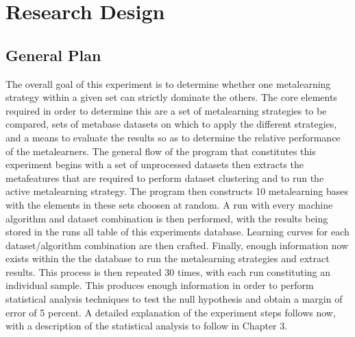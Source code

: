 \chapter{Research Design}
\label{Chapter3}
\section{General Plan}
The overall goal of this experiment is to determine whether one metalearning
strategy within a given set can strictly dominate the others. The core elements
required in order to determine this are a set of metalearning strategies to be
compared, sets of metabase datasets on which to apply the different strategies,
and a means to evaluate the results so as to determine the relative performance
of the metalearners. The general flow of the program that constitutes this
experiment begins with a set of unprocessed datasets then extracts the
metafeatures that are required to perform dataset clustering and to
run the active metalearning strategy. The program then constructs 10
metalearning bases with the elements in these sets choosen at random. A run with
every machine algorithm and dataset combination is then performed, with the
results being stored in the runs all table of this experiments database. Learning curves for each
dataset/algorithm combination are then crafted. Finally, enough information now
exists within the the database to run the metalearning strategies
and extract results. This process is then repeated 30 times, with each run
constituting an individual sample. This produces enough information in order
to perform statistical analysis techniques to test the null hypothesis and
obtain a margin of error of 5 percent. A detailed explanation of the experiment
steps follows now, with a description of the statistical analysis to follow in
Chapter 3.

